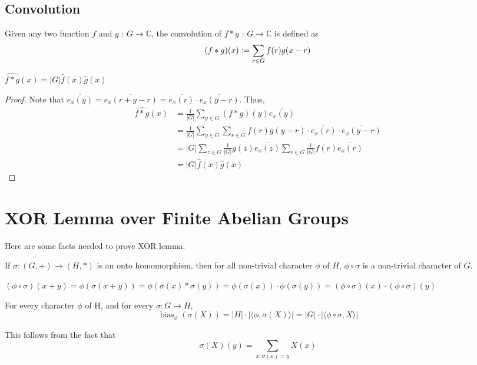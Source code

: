 \section{Convolution}
\begin{definition}
Given any two function $f$ and $g$ : $G \rightarrow \mathbb{C}$, the convolution of $f*g$ :  $G \rightarrow \mathbb{C}$ is defined as
$$(f*g)(x) \vcentcolon= \sum\limits_{r \in G} f(r) g(x - r)$$
\end{definition}

\begin{prop}
$\widehat{f*g}(x) = |G| \widehat{f}(x) \widehat{g}(x)$
\end{prop}

\begin{proof}
Note that $\overline{e_{x}(y)} = \overline{e_x(r + y - r)} = \overline{e_x(r)} \cdot  \overline {e_x(y-r)}$. Thus,
\begin{align*}
\widehat{f*g}(x)
& = \frac{1}{|G|} \sum\limits_{y \in G} (f*g)(y) \overline{e_{x}(y)} \\
& = \frac{1}{|G|} \sum\limits_{y \in G}	
	\sum\limits_{r \in G} f(r) {g(y - r)} \cdot  \overline{e_x(r)} \cdot \overline{e_x(y-r)}\\
& = |G| \sum\limits_{z \in G} \frac{1}{|G|} g(z) \overline{e_x(z)} 
	    \sum\limits_{r \in G} \frac{1}{|G|} f(r) \overline{e_x(r)}   \\
& = |G| \widehat{f}(x) \widehat{g}(x)		 	
\end{align*}
\end{proof}

\chapter{XOR Lemma over Finite Abelian Groups}

Here are some facts needed to prove XOR lemma. 
\begin{fact}
If $\sigma : (G, +) \rightarrow (H, *)$ is an onto homomorphism, then for all non-trivial character $\phi$ of $H$, $\phi \circ \sigma$ is a non-trivial character of $G$.
\end{fact} 
$(\phi \circ \sigma)(x+y) = \phi (\sigma (x+y)) = \phi (\sigma(x) * \sigma(y))
= \phi (\sigma (x)) \cdot \phi (\sigma (y)) 
= (\phi \circ \sigma)(x) \cdot (\phi \circ \sigma)(y)$

\begin{fact}
For every character $\phi$ of H, and for every $\sigma: G \rightarrow H$,
$$\operatorname{bias}_\phi(\sigma (X))
= |H| \cdot |\langle \phi, \sigma(X) \rangle | 
= |G| \cdot |\langle \phi \circ \sigma, X \rangle |$$
\end{fact}
This follows from the fact that
$$\sigma(X)(y) = \sum\limits_{x : \sigma(x) = y} X(x)$$

